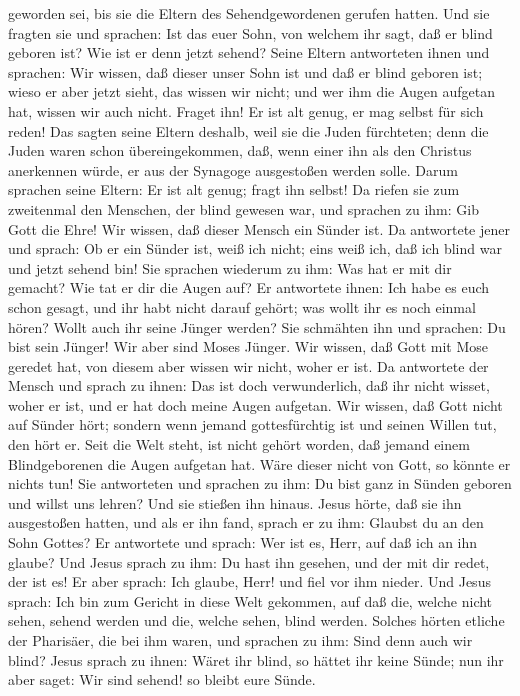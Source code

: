 geworden sei, bis sie die Eltern des Sehendgewordenen gerufen hatten.
 Und sie fragten sie und sprachen: Ist das euer Sohn, von
welchem ihr sagt, daß er blind geboren ist? Wie ist er denn jetzt
sehend?  Seine Eltern antworteten ihnen und sprachen: Wir
wissen, daß dieser unser Sohn ist und daß er blind geboren ist;
 wieso er aber jetzt sieht, das wissen wir nicht; und wer
ihm die Augen aufgetan hat, wissen wir auch nicht. Fraget ihn! Er ist
alt genug, er mag selbst für sich reden!  Das sagten
seine Eltern deshalb, weil sie die Juden fürchteten; denn die Juden
waren schon übereingekommen, daß, wenn einer ihn als den Christus
anerkennen würde, er aus der Synagoge ausgestoßen werden solle.
 Darum sprachen seine Eltern: Er ist alt genug; fragt ihn
selbst!  Da riefen sie zum zweitenmal den Menschen, der
blind gewesen war, und sprachen zu ihm: Gib Gott die Ehre! Wir wissen,
daß dieser Mensch ein Sünder ist.  Da antwortete jener
und sprach: Ob er ein Sünder ist, weiß ich nicht; eins weiß ich, daß ich
blind war und jetzt sehend bin!  Sie sprachen wiederum zu
ihm: Was hat er mit dir gemacht? Wie tat er dir die Augen auf?
 Er antwortete ihnen: Ich habe es euch schon gesagt, und
ihr habt nicht darauf gehört; was wollt ihr es noch einmal hören? Wollt
auch ihr seine Jünger werden?  Sie schmähten ihn und
sprachen: Du bist sein Jünger! Wir aber sind Moses Jünger.
 Wir wissen, daß Gott mit Mose geredet hat, von diesem
aber wissen wir nicht, woher er ist.  Da antwortete der
Mensch und sprach zu ihnen: Das ist doch verwunderlich, daß ihr nicht
wisset, woher er ist, und er hat doch meine Augen aufgetan.
 Wir wissen, daß Gott nicht auf Sünder hört; sondern wenn
jemand gottesfürchtig ist und seinen Willen tut, den hört er.
 Seit die Welt steht, ist nicht gehört worden, daß jemand
einem Blindgeborenen die Augen aufgetan hat.  Wäre dieser
nicht von Gott, so könnte er nichts tun!  Sie antworteten
und sprachen zu ihm: Du bist ganz in Sünden geboren und willst uns
lehren? Und sie stießen ihn hinaus.  Jesus hörte, daß sie
ihn ausgestoßen hatten, und als er ihn fand, sprach er zu ihm: Glaubst
du an den Sohn Gottes?  Er antwortete und sprach: Wer ist
es, Herr, auf daß ich an ihn glaube?  Und Jesus sprach zu
ihm: Du hast ihn gesehen, und der mit dir redet, der ist es!
 Er aber sprach: Ich glaube, Herr! und fiel vor ihm
nieder.  Und Jesus sprach: Ich bin zum Gericht in diese
Welt gekommen, auf daß die, welche nicht sehen, sehend werden und die,
welche sehen, blind werden.  Solches hörten etliche der
Pharisäer, die bei ihm waren, und sprachen zu ihm: Sind denn auch wir
blind?  Jesus sprach zu ihnen: Wäret ihr blind, so hättet
ihr keine Sünde; nun ihr aber saget: Wir sind sehend! so bleibt eure
Sünde.

